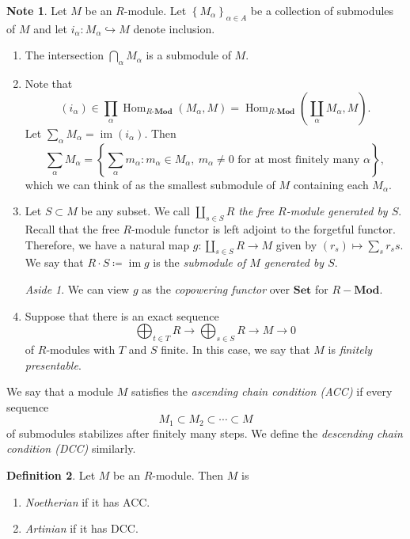 \documentclass[10pt,letterpaper,cm]{nupset}
\theoremstyle{definition}
\newtheorem{definition}{Definition}[subsection]
\newtheorem{note}[definition]{Note}
\theoremstyle{theorem}
\theoremstyle{remark}
\newtheorem*{aside}{Aside}
\newcommand{\1}{\mathbf{1}}
\newcommand{\0}{\vec 0}
\newcommand{\dcc}{\textsf{DCC}\xspace}
\newcommand{\acc}{\textsf{ACC}\xspace}
\DeclareMathOperator{\im}{im}
\DeclareMathOperator{\Hom}{Hom}
\begin{document}
\begin{note} Let $M$ be an $R$-module. Let $\left\{M_{\alpha}\right\}_{\alpha \in A}$ be a collection of submodules of $M$ and let  $i_{\alpha} :M_{\alpha} \hookrightarrow M$ denote inclusion.
\begin{enumerate}
\item The intersection $\bigcap_{\alpha} M_{\alpha}$ is a submodule of $M$. 
\item Note that $$\left(i_{\alpha}\right) \in \prod_{\alpha}\Hom_{R\text{-}\mathbf{Mod}}(M_{\alpha}, M) = \Hom_{R\text{-}\mathbf{Mod}}\left(\coprod_{\alpha} M_{\alpha}, M\right).$$ Let $\sum_{\alpha} M_{\alpha} = \im(i_{\alpha})$. Then $$\sum_{\alpha} M_{\alpha}  = \left\{\sum_{\alpha} m_{\alpha} : m_{\alpha} \in M_{\alpha}, \ m_{\alpha} \ne 0 \text{ for at most finitely many } \alpha\right\},$$ which we can think of as  the
smallest submodule of $M$ containing each $M_{\alpha}$. 
\item Let $S\subset M$ be any subset. We call $\coprod_{s\in S} R$ \textit{the free $R$-module generated by $S$}. Recall that the free $R$-module functor is left adjoint to the forgetful functor. Therefore, we have a natural map $g : \coprod_{s\in S} R \to M$ given by $\left(r_s\right) \mapsto \sum_s r_ss$. We say that $R \cdot S \coloneqq \im g$ is the \textit{submodule of $M$ generated by $S$}.
\begin{aside}
We can view $g$ as the \textit{copowering functor} over $\mathbf{Set}$ for $R{-}\mathbf{Mod}$.  
\end{aside}
\item  Suppose that there is an exact sequence $$\bigoplus_{t\in T}{R}\to \bigoplus_{s\in S}{R} \to M \to 0$$ of $R$-modules with $T$ and $S$ finite. In this case, we say that $M$ is \textit{finitely presentable}. 
\end{enumerate}
\end{note}

\medskip

We say that a module $M$ satisfies the \textit{ascending chain condition (\acc)} if every sequence
\[
M_1 \subset M_2 \subset \cdots \subset M
\]
of submodules stabilizes after finitely many steps. We define the \textit{descending chain condition (\dcc)} similarly.

\begin{definition} Let $M$ be an $R$-module. Then $M$ is
\begin{enumerate}
\item \textit{Noetherian} if it has \acc.
\item \textit{Artinian} if it has \dcc.
\end{enumerate}
\end{definition}
\end{document}

